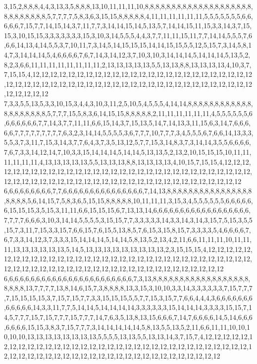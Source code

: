 3,15,2,8,8,8,4,4,3,13,3,5,8,8,8,13,10,11,11,11,10,8,8,8,8,8,8,8,8,8,8,8,8,8,8,8,8,8,8,8,8,8,8,8,8,8,8,8,8,5,7,7,7,7,5,8,3,6,3,15,15,8,8,8,8,8,4,11,11,11,11,11,11,5,5,5,5,5,5,5,6,6,6,6,6,7,15,7,7,14,15,14,3,7,11,7,7,3,14,14,15,14,5,13,5,7,14,14,15,11,15,3,3,14,3,7,15,15,3,10,15,15,3,3,3,3,3,3,3,15,3,10,3,14,5,5,5,4,4,3,7,7,11,11,15,11,7,7,14,14,5,5,5,7,6,6,6,14,13,4,14,5,5,3,7,10,11,7,3,14,5,14,15,15,15,14,14,15,15,5,5,12,5,15,7,3,14,5,8,14,7,3,14,14,14,5,4,6,6,6,6,7,6,7,14,3,14,12,3,7,10,3,10,3,14,14,14,5,14,14,14,5,13,5,2,8,2,3,6,6,11,11,11,11,11,11,11,11,2,13,13,13,13,13,5,5,13,13,8,8,13,13,13,13,4,10,3,7,7,15,15,4,12,12,12,12,12,12,12,12,12,12,12,12,12,12,12,12,12,12,12,12,12,12,12,12,12,12,12,12,12,12,12,12,12,12,12,12,12,12,12,12,12,12,12,12,12,12,12,12,12,12,12,12,12,12,12,12,12,12
7,3,3,5,5,13,5,3,3,10,15,3,4,4,3,10,3,11,2,5,10,5,4,5,5,5,4,14,14,8,8,8,8,8,8,8,8,8,8,8,8,8,8,8,8,8,8,8,8,5,7,7,7,15,5,8,3,6,14,15,15,8,8,8,8,8,2,11,11,11,11,11,11,4,5,5,5,5,5,5,6,6,6,6,6,6,6,7,7,14,3,7,7,11,11,6,6,15,14,3,7,15,13,5,14,7,14,13,3,11,15,6,3,14,7,6,6,6,6,6,7,7,7,7,7,7,7,7,7,6,3,2,3,14,14,5,5,5,5,3,6,7,7,7,10,7,7,7,3,4,5,5,5,6,7,6,6,14,13,3,3,5,5,3,7,3,11,7,15,3,14,3,7,7,6,4,3,7,3,5,13,12,5,7,7,15,3,14,8,3,7,3,14,14,3,5,5,6,6,6,6,7,6,7,3,3,14,12,14,7,10,3,3,15,14,14,14,5,14,14,5,13,13,5,2,13,2,10,15,15,15,10,11,11,11,11,11,11,4,13,13,13,13,13,5,5,13,13,13,8,8,13,13,13,13,4,10,15,7,15,15,4,12,12,12,12,12,12,12,12,12,12,12,12,12,12,12,12,12,12,12,12,12,12,12,12,12,12,12,12,12,12,12,12,12,12,12,12,12,12,12,12,12,12,12,12,12,12,12,12,12,12,12,12,12,12,12,12,12,12
6,6,6,6,6,6,6,6,6,7,7,6,6,6,6,6,6,6,6,6,6,6,6,6,6,6,7,14,13,8,8,8,8,8,8,8,8,8,8,8,8,8,8,8,8,8,8,8,8,5,6,14,15,7,5,8,3,6,5,15,15,8,8,8,8,8,10,11,11,11,3,15,3,4,5,5,5,5,5,5,6,6,6,6,6,6,15,15,15,3,5,15,3,11,11,6,6,15,15,15,6,7,13,13,14,6,6,6,6,6,6,6,6,6,6,6,6,6,6,6,6,6,6,7,7,7,7,6,6,6,3,10,3,14,14,5,5,5,5,3,15,15,7,7,3,3,3,3,3,14,3,3,14,3,14,3,15,7,5,15,3,5,5,15,7,3,11,7,15,3,3,15,7,6,6,15,7,6,15,5,13,8,5,7,6,15,3,15,8,15,7,3,3,3,3,5,4,6,6,6,6,7,6,7,3,3,14,12,3,7,3,3,3,15,14,14,14,5,14,14,5,8,13,5,2,13,4,2,11,6,6,11,11,11,10,11,11,11,13,13,13,13,13,13,5,14,5,13,13,13,13,13,13,13,13,13,2,3,15,15,15,4,12,12,12,12,12,12,12,12,12,12,12,12,12,12,12,12,12,12,12,12,12,12,12,12,12,12,12,12,12,12,12,12,12,12,12,12,12,12,12,12,12,12,12,12,12,12,12,12,12,12,12,12,12,12,12,12,12,12
6,6,6,6,6,6,6,6,6,6,6,6,6,6,6,6,6,6,6,6,6,6,6,6,7,3,13,8,8,8,8,8,8,8,8,8,8,8,8,8,8,8,8,8,8,8,8,8,8,13,7,7,7,7,13,8,14,6,15,7,3,8,8,8,8,13,3,15,3,10,10,3,3,14,3,3,3,3,3,3,7,15,7,7,7,7,15,15,15,15,3,7,15,7,15,7,7,3,3,15,15,15,5,5,7,7,15,3,15,7,7,6,6,4,4,4,3,6,6,6,6,6,6,6,6,6,6,6,6,14,3,3,11,7,7,5,14,14,5,14,14,14,14,3,3,3,3,3,3,15,14,14,14,3,3,3,3,15,15,7,14,5,7,7,7,15,7,15,7,7,7,15,7,7,7,14,7,6,3,5,13,8,13,15,6,6,6,7,14,7,6,6,6,6,14,5,14,6,6,6,6,6,6,6,15,15,3,8,3,7,15,7,7,7,3,14,14,14,14,14,5,8,13,5,5,13,5,2,11,6,6,11,11,10,10,10,10,10,13,13,13,13,13,13,13,13,5,5,5,5,13,13,5,5,13,13,14,3,7,15,7,4,12,12,12,12,12,12,12,12,12,12,12,12,12,12,12,12,12,12,12,12,12,12,12,12,12,12,12,12,12,12,12,12,12,12,12,12,12,12,12,12,12,12,12,12,12,12,12,12,12,12,12,12,12,12,12,12,12,12
